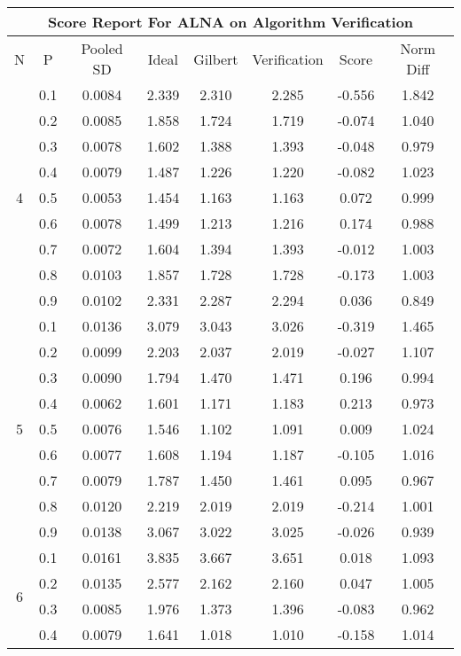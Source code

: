 \documentclass[11pt,a4paper]{report}
\begin{document}
\begin{longtable}{ | c | c || c | c | c | c | c | c | }
\hline
\multicolumn{8}{|c|}{ Score Report For ALNA on Algorithm Verification} \\
\hline
N & P & Pooled SD &  Ideal &  Gilbert & Verification  & Score & Norm Diff \\
 \hline
 \hline
 \endhead
\multirow{9}{*}{4} & 0.1 & 0.0084 & 2.339 & 2.310 & 2.285 & -0.556 & 1.842 \\
 & 0.2 & 0.0085 & 1.858 & 1.724 & 1.719 & -0.074 & 1.040 \\
 & 0.3 & 0.0078 & 1.602 & 1.388 & 1.393 & -0.048 & 0.979 \\
 & 0.4 & 0.0079 & 1.487 & 1.226 & 1.220 & -0.082 & 1.023 \\
 & 0.5 & 0.0053 & 1.454 & 1.163 & 1.163 & 0.072 & 0.999 \\
 & 0.6 & 0.0078 & 1.499 & 1.213 & 1.216 & 0.174 & 0.988 \\
 & 0.7 & 0.0072 & 1.604 & 1.394 & 1.393 & -0.012 & 1.003 \\
 & 0.8 & 0.0103 & 1.857 & 1.728 & 1.728 & -0.173 & 1.003 \\
 & 0.9 & 0.0102 & 2.331 & 2.287 & 2.294 & 0.036 & 0.849 \\
 \hline
\multirow{9}{*}{5} & 0.1 & 0.0136 & 3.079 & 3.043 & 3.026 & -0.319 & 1.465 \\
 & 0.2 & 0.0099 & 2.203 & 2.037 & 2.019 & -0.027 & 1.107 \\
 & 0.3 & 0.0090 & 1.794 & 1.470 & 1.471 & 0.196 & 0.994 \\
 & 0.4 & 0.0062 & 1.601 & 1.171 & 1.183 & 0.213 & 0.973 \\
 & 0.5 & 0.0076 & 1.546 & 1.102 & 1.091 & 0.009 & 1.024 \\
 & 0.6 & 0.0077 & 1.608 & 1.194 & 1.187 & -0.105 & 1.016 \\
 & 0.7 & 0.0079 & 1.787 & 1.450 & 1.461 & 0.095 & 0.967 \\
 & 0.8 & 0.0120 & 2.219 & 2.019 & 2.019 & -0.214 & 1.001 \\
 & 0.9 & 0.0138 & 3.067 & 3.022 & 3.025 & -0.026 & 0.939 \\
 \hline
\multirow{9}{*}{6} & 0.1 & 0.0161 & 3.835 & 3.667 & 3.651 & 0.018 & 1.093 \\
 & 0.2 & 0.0135 & 2.577 & 2.162 & 2.160 & 0.047 & 1.005 \\
 & 0.3 & 0.0085 & 1.976 & 1.373 & 1.396 & -0.083 & 0.962 \\
 & 0.4 & 0.0079 & 1.641 & 1.018 & 1.010 & -0.158 & 1.014 \\

\end{longtable}
\end{document}
